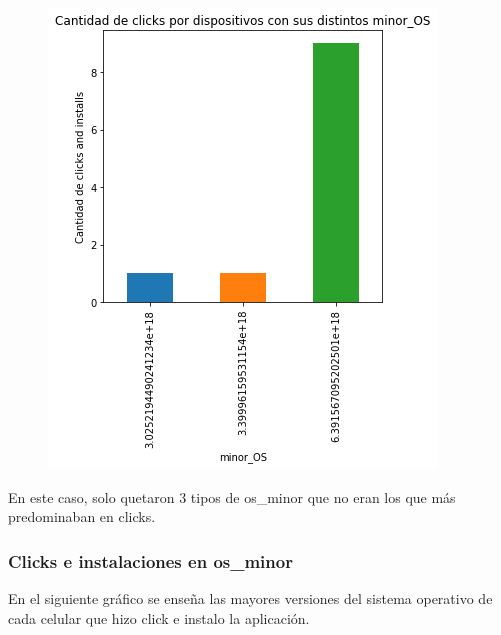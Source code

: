 \documentclass[a4paper, 12pt]{article}
\begin{document}
{{	 
		\begin{figure}[H]
			\centering
			\includegraphics[scale = 0.5]{images/clicks-installs/minor_os.png}
			\caption{}
		\end{figure}
	
	
	En este caso, solo quetaron 3 tipos de os\_minor que no eran los que más predominaban en clicks.
	
	\subsubsection{Clicks e instalaciones en os\_minor}
	En el siguiente gráfico se enseña las mayores versiones del sistema operativo de cada celular que hizo click e instalo la aplicación.
	
}}
\end{document}

